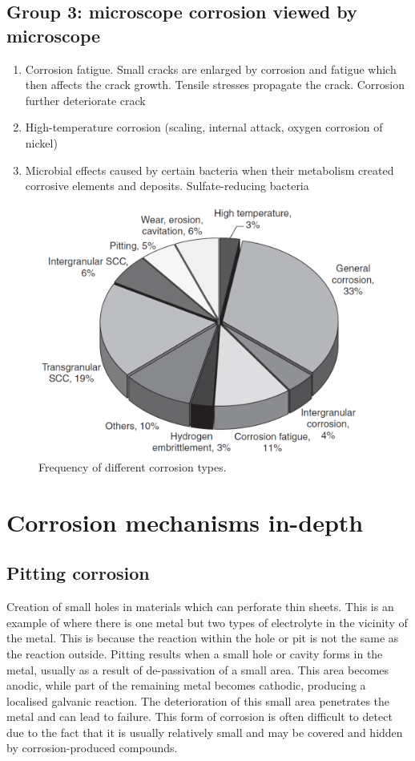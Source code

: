 \subsection{Group 3: microscope corrosion viewed by microscope}
\begin{enumerate}
    \item Corrosion fatigue. Small cracks are enlarged by corrosion and fatigue which then affects the crack growth. Tensile stresses propagate the crack. Corrosion further deteriorate crack
    \item High-temperature corrosion (scaling, internal attack, oxygen corrosion of nickel)
    \item Microbial effects caused by certain bacteria when their metabolism created corrosive elements and deposits. Sulfate-reducing bacteria
\end{enumerate}
\begin{figure}[H]
    \centering
    \includegraphics[width = \textwidth]{img/figure74.png}
    \caption{Frequency of different corrosion types.}
\end{figure}
\section{Corrosion mechanisms in-depth}
\subsection{Pitting corrosion}
Creation of small holes in materials which can perforate thin sheets. This is an example of where there is one metal but two types of electrolyte in the vicinity of the metal. This is because the reaction within the hole or pit is not the same as the reaction outside. Pitting results when a small hole or cavity forms in the metal, usually as a result of de-passivation of a small area. This area becomes anodic, while part of the remaining metal becomes cathodic, producing a localised galvanic reaction. The deterioration of this small area penetrates the metal and can lead to failure. This form of corrosion is often difficult to detect due to the fact that it is usually relatively small and may be covered and hidden by corrosion-produced compounds.

